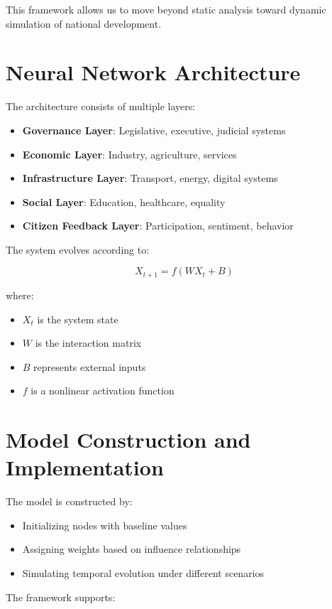 \documentclass[12pt]{article}
\begin{document}
This framework allows us to move beyond static analysis toward dynamic simulation of national development.

\section{Neural Network Architecture}

The architecture consists of multiple layers:

\begin{itemize}
\item \textbf{Governance Layer}: Legislative, executive, judicial systems
\item \textbf{Economic Layer}: Industry, agriculture, services
\item \textbf{Infrastructure Layer}: Transport, energy, digital systems
\item \textbf{Social Layer}: Education, healthcare, equality
\item \textbf{Citizen Feedback Layer}: Participation, sentiment, behavior
\end{itemize}

The system evolves according to:

\[
X_{t+1} = f(WX_t + B)
\]

where:
\begin{itemize}
\item $X_t$ is the system state
\item $W$ is the interaction matrix
\item $B$ represents external inputs
\item $f$ is a nonlinear activation function
\end{itemize}

\section{Model Construction and Implementation}

The model is constructed by:

\begin{itemize}
\item Initializing nodes with baseline values
\item Assigning weights based on influence relationships
\item Simulating temporal evolution under different scenarios
\end{itemize}

The framework supports:
\end{document}
